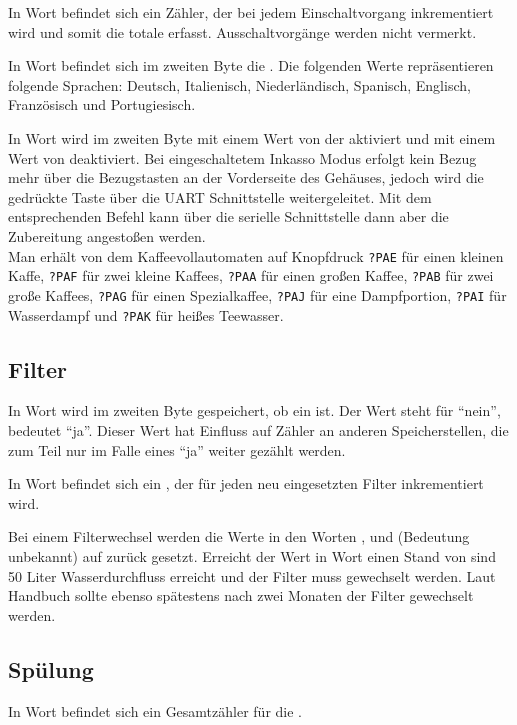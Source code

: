 In Wort  befindet sich ein Zähler, der bei jedem Einschaltvorgang inkrementiert wird und somit die totale  erfasst.
Ausschaltvorgänge werden nicht vermerkt.

In Wort  befindet sich im zweiten Byte die .
Die folgenden Werte repräsentieren folgende Sprachen:
 Deutsch,
 Italienisch,
 Niederländisch, 
 Spanisch,
 Englisch,
 Französisch und
 Portugiesisch.

In Wort  wird im zweiten Byte mit einem Wert von  der  aktiviert und mit einem Wert von  deaktiviert.
Bei eingeschaltetem Inkasso Modus erfolgt kein Bezug mehr über die Bezugstasten an der Vorderseite des Gehäuses, jedoch wird die gedrückte Taste über die \ac{UART} Schnittstelle weitergeleitet.
Mit dem entsprechenden Befehl kann über die serielle Schnittstelle dann aber die Zubereitung angestoßen werden.\\
Man erhält von dem Kaffeevollautomaten auf Knopfdruck
\texttt{?PAE} für einen kleinen Kaffe,
\texttt{?PAF} für zwei kleine Kaffees,
\texttt{?PAA} für einen großen Kaffee,
\texttt{?PAB} für zwei große Kaffees,
\texttt{?PAG} für einen Spezialkaffee,
\texttt{?PAJ} für eine Dampfportion,
\texttt{?PAI} für Wasserdampf und
\texttt{?PAK} für heißes Teewasser.

\subsection{Filter}
In Wort  wird im zweiten Byte gespeichert, ob ein  ist.
Der Wert  steht für "`nein"',  bedeutet "`ja"'.
Dieser Wert hat Einfluss auf Zähler an anderen Speicherstellen, die zum Teil nur im Falle eines "`ja"' weiter gezählt werden.

In Wort  befindet sich ein , der für jeden neu eingesetzten Filter inkrementiert wird.

Bei einem Filterwechsel werden die Werte in den Worten ,  und  (Bedeutung unbekannt) auf  zurück gesetzt.
Erreicht der Wert in Wort  einen Stand von  sind 50 Liter Wasserdurchfluss erreicht und der Filter muss gewechselt werden.
Laut Handbuch sollte ebenso spätestens nach zwei Monaten der Filter gewechselt werden.

\subsection{Spülung}
In Wort  befindet sich ein Gesamtzähler für die .


